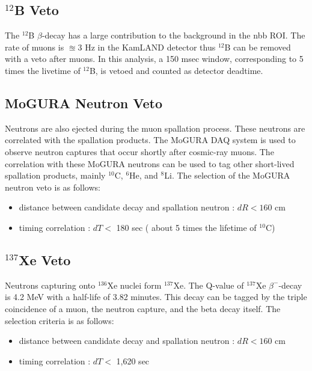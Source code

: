 \subsection*{$^{12}$B Veto}
The $^{12}$B $\beta$-decay has a large contribution to the background in the \0nbb ROI. The rate of muons is $\approxeq 3$ Hz in the KamLAND detector thus $^{12}$B can be removed with a veto after muons. In this analysis, a 150 msec window, corresponding to 5 times the livetime of $^{12}$B, is vetoed and counted as detector deadtime.

\subsection*{MoGURA Neutron Veto}
Neutrons are also ejected during the muon spallation process. These neutrons are correlated with the spallation products. The MoGURA DAQ system is used to observe neutron captures that occur shortly after cosmic-ray muons. The correlation with these MoGURA neutrons can be used to tag other short-lived spallation products, mainly $^{10}$C, $^{6}$He, and $^{8}$Li. The selection of the MoGURA neutron veto is as follows:
\begin{itemize}
	\item distance between candidate decay and spallation neutron : $dR<160$ cm
	\item timing correlation : $dT < $ 180 sec ( about 5 times the lifetime of $^{10}$C)
\end{itemize}

\subsection*{$^{137}$Xe Veto}
Neutrons capturing onto $^{136}$Xe nuclei form $^{137}$Xe. The Q-value of $^{137}$Xe $\beta^-$-decay is 4.2 MeV with a half-life of 3.82 minutes. This decay can be tagged by the triple coincidence of a muon, the neutron capture, and the beta decay itself. The selection criteria is as follows:
\begin{itemize}
	\item distance between candidate decay and spallation neutron : $dR<160$ cm
	\item timing correlation : $dT < $ 1,620 sec
\end{itemize}

